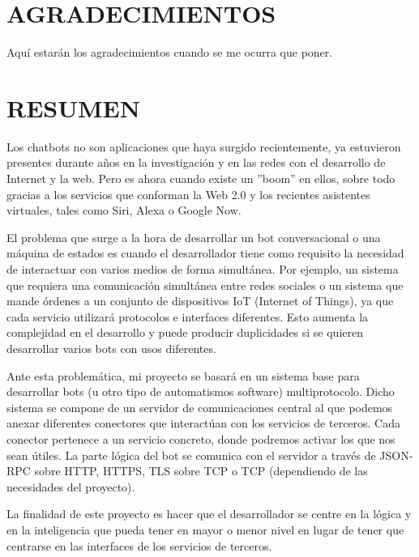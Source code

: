 \documentclass[spanish,12pt, a4paper, twoside]{paper}
\let\oldsection\section
\def\section{\cleardoublepage\oldsection}
\newcommand\blankpage{%
    \null
    \thispagestyle{empty}%
    \addtocounter{page}{-1}%
    \newpage}
\begin{document}
\afterpage{\blankpage}


\section*{AGRADECIMIENTOS}
Aquí estarán los agradecimientos cuando se me ocurra que poner.

\section*{RESUMEN}
Los chatbots no son aplicaciones que haya surgido recientemente, ya estuvieron presentes durante años en la investigación y en las redes con el desarrollo de Internet y la web. Pero es ahora cuando existe un ''boom'' en ellos, sobre todo gracias a los servicios que conforman la Web 2.0 y los recientes asistentes virtuales, tales como Siri, Alexa o Google Now.
\newline

El problema que surge a la hora de desarrollar un bot conversacional o una máquina de estados es cuando el desarrollador tiene como requisito la necesidad de interactuar con varios medios de forma simultánea. Por ejemplo, un sistema que requiera una comunicación simultánea entre redes sociales o un sistema que mande órdenes a un conjunto de dispositivos IoT (Internet of Things), ya que cada servicio utilizará protocolos e interfaces diferentes. Esto aumenta la complejidad en el desarrollo y puede producir duplicidades si se quieren desarrollar varios bots con usos diferentes.
\newline

Ante esta problemática, mi proyecto se basará en un sistema base para desarrollar bots (u otro tipo de automatismos software) multiprotocolo. Dicho sistema se compone de un servidor de comunicaciones central al que podemos anexar diferentes conectores que interactúan con los servicios de terceros. Cada conector pertenece a un servicio concreto, donde podremos activar los que nos sean útiles. La parte lógica del bot se comunica con el servidor a través de JSON-RPC sobre HTTP, HTTPS, TLS sobre TCP o TCP (dependiendo de las necesidades del proyecto).
\newline

La finalidad de este proyecto es hacer que el desarrollador se centre en la lógica y en la inteligencia que pueda tener en mayor o menor nivel en lugar de tener que centrarse en las interfaces de los servicios de terceros.
\end{document}
